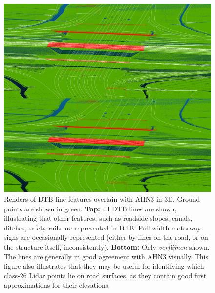 \begin{figure}[h!]
    \centering
    \includegraphics[width=0.95\linewidth]{p2/figs/ahn_sample_10.png} 
    \caption{Renders of DTB line features overlain with AHN3 in 3D. Ground points are shown in green. \textbf{Top:} all DTB lines are shown, illustrating that other features, such as roadside slopes, canals, ditches, safety rails are represented in DTB. Full-width motorway signs are occasionally represented (either by lines on the road, or on the structure itself, inconsistently). \textbf{Bottom:} Only \textit{verflijnen} shown. The lines are generally in good agreement with AHN3 visually. This figure also illustrates that they may be useful for identifying which class-26 Lidar points lie on road surfaces, as they contain good first approximations for their elevations.}
    \label{fig:dtbahn}
\end{figure}


